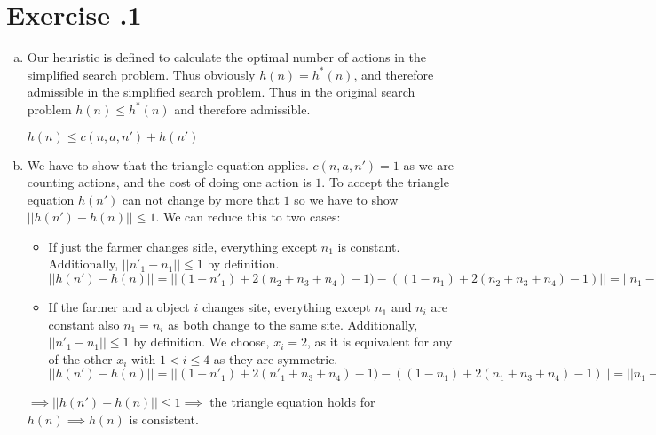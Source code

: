 \documentclass[11pt]{scrartcl}
\newcounter{sheetnr}
\newenvironment{exercise}[2][]{\section*{Exercise \thesheetnr.#2\expandafter\ifstrempty\expandafter{#1}{}{\ (#1)}}}{}
\newenvironment{subexercises}{\begin{enumerate}[a), font=\bfseries, wide, labelindent=0pt]}{\end{enumerate}}
\begin{document}
\begin{exercise}[Heuristics]{1}
\begin{subexercises}
            \begin{itemize}
                \item $(1-n_1) = 1$ when the farmer is on the goal shore and thus has to go back and get another object from the starting shore. $(1-n_1) = 0$ if he is already on the starting shore and thus doesn't have to travel back to the starting shore to get another object.
                \item $2(n_2 + n_3 + n_4) - 1$: for each object he brings from the starting shore he has to travel back except for the last one he brings to the other side.
            \end{itemize}
        
            \item Our heuristic is defined to calculate the optimal number of actions in the simplified search problem. Thus obviously $h(n) = h^*(n)$, and therefore admissible in the simplified search problem. Thus in the original search problem $h(n) \leq h^*(n)$ and therefore admissible.
        
            \begin{center}
                $h(n) \leq c(n,a,n') + h(n')$
            \end{center}
        
            \item We have to show that the triangle equation applies. $c(n,a,n') = 1$ as we are counting actions, and the cost of doing one action is $1$. To accept the triangle equation $h(n')$ can not change by more that $1$ so we have to show $||h(n') - h(n)|| \leq 1$. We can reduce this to two cases:
            \begin{itemize}
                \item If just the farmer changes side, everything except $n_1$ is constant. Additionally, $||{n'}_1 - n_1 || \leq 1$ by definition. \\
                $||h(n') - h(n)|| = ||(1 - {n'}_1) + 2(n_2 + n_3 + n_4) - 1) - ((1 - n_1) + 2(n_2 + n_3 + n_4) - 1)|| = ||n_1 - {n'}_1|| \leq 1$ \\
                \item If the farmer and a object $i$ changes site, 
                everything except $n_1$ and $n_i $ are constant also $n_1 = n_i$ as both change to the same site. Additionally, $||{n'}_1 - n_1 || \leq 1$ by definition. We choose, $x_i = 2$, as it is equivalent for any of the other $x_i$ with $1 < i \leq 4$ as they are symmetric. \\
                $||h(n') - h(n)|| = ||(1 - {n'}_1) + 2({n'}_1 + n_3 + n_4) - 1) - ((1 - n_1) + 2(n_1 + n_3 + n_4) - 1)|| = ||n_1 - {n'}_1 + 2{n'}_1 - 2n_1 || = || {n'}_1 - n_1 || = 1$ \\
            \end{itemize}
        
            $\implies ||h(n') - h(n)|| \leq 1 \implies$ the triangle equation holds for $h(n) \implies h(n)$ is consistent.
        
            
        
        
        \end{subexercises}
    \end{exercise}
\end{document}
